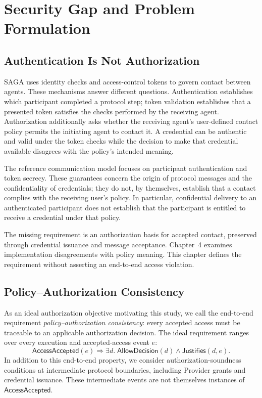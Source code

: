 \section{Security Gap and Problem Formulation}

\subsection{Authentication Is Not Authorization}

SAGA uses identity checks and access-control tokens to govern contact between
agents. These mechanisms answer different questions. Authentication establishes
which participant completed a protocol step; token validation establishes that
a presented token satisfies the checks performed by the receiving agent.
Authorization additionally asks whether the receiving agent's user-defined
contact policy permits the initiating agent to contact it. A credential can be
authentic and valid under the token checks while the decision to make that
credential available disagrees with the policy's intended meaning.

The reference communication model focuses on participant authentication and
token secrecy. These guarantees concern the origin of protocol messages and
the confidentiality of credentials; they do not, by themselves, establish
that a contact complies with the receiving user's policy. In particular,
confidential delivery to an authenticated participant does not establish that
the participant is entitled to receive a credential under that policy.

The missing requirement is an authorization basis for accepted contact,
preserved through credential issuance and message acceptance. Chapter~4
examines implementation disagreements with policy meaning. This chapter
defines the requirement without asserting an end-to-end access violation.


\subsection{Policy--Authorization Consistency}

As an ideal authorization objective motivating this study, we call the
end-to-end requirement \emph{policy--authorization consistency}:
every accepted access must be traceable to an applicable authorization decision.
The ideal requirement ranges over every execution and accepted-access event $e$:
\[
  \mathsf{AccessAccepted}(e)
  \Longrightarrow
  \exists d.\;\mathsf{AllowDecision}(d)
  \land \mathsf{Justifies}(d,e).
\]
In addition to this end-to-end property, we consider authorization-soundness
conditions at intermediate protocol boundaries, including Provider grants
and credential issuance. These intermediate events are not themselves
instances of $\mathsf{AccessAccepted}$.

